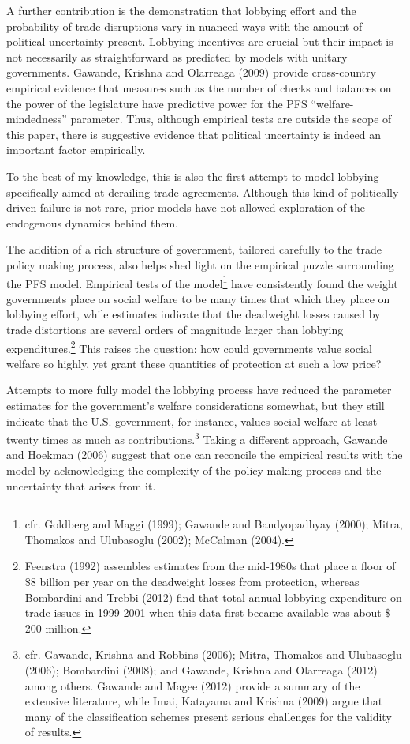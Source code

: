 \documentclass[10pt]{article}
\begin{document}
A further contribution is the demonstration that lobbying effort and the probability of trade disruptions vary in nuanced ways with the amount of political uncertainty present. Lobbying incentives are crucial but their impact is not necessarily as straightforward as predicted by models with unitary governments. Gawande, Krishna and Olarreaga (2009) provide cross-country empirical evidence that measures such as the number of checks and balances on the power of the legislature have predictive power for the PFS ``welfare-mindedness'' parameter. Thus, although empirical tests are outside the scope of this paper, there is suggestive evidence that political uncertainty is indeed an important factor empirically.

To the best of my knowledge, this is also the first attempt to model lobbying specifically aimed at derailing trade agreements. Although this kind of politically-driven failure is not rare, prior models have not allowed exploration of the endogenous dynamics behind them.

The addition of a rich structure of government, tailored carefully to the trade policy making process, also helps shed light on the empirical puzzle surrounding the PFS model. Empirical tests of the model\footnote{cfr. Goldberg and Maggi (1999); Gawande and Bandyopadhyay (2000); Mitra, Thomakos and Ulubasoglu (2002); McCalman (2004).\label{fn:gh_lobby}} have consistently found the weight governments place on social welfare to be many times that which they place on lobbying effort, while estimates indicate that the deadweight losses caused by trade distortions are several orders of magnitude larger than lobbying expenditures.\footnote{Feenstra (1992) assembles estimates from the mid-1980s that place a floor of $\$$8 billion per year on the deadweight losses from protection, whereas Bombardini and Trebbi (2012) find that total annual lobbying expenditure on trade issues in 1999-2001 when this data first became available was about $\$$200 million.} This raises the question: how could governments value social welfare so highly, yet grant these quantities of protection at such a low price?

Attempts to more fully model the lobbying process have reduced the parameter estimates for the government's welfare considerations somewhat, but they still indicate that the U.S. government, for instance, values social welfare at least twenty times as much as contributions.\footnote{cfr. Gawande, Krishna and Robbins (2006); Mitra, Thomakos and Ulubasoglu (2006); Bombardini (2008); and Gawande, Krishna and Olarreaga (2012) among others. Gawande and Magee (2012) provide a summary of the extensive literature, while Imai, Katayama and Krishna (2009) argue that many of the classification schemes present serious challenges for the validity of results.} Taking a different approach, Gawande and Hoekman (2006) suggest that one can reconcile the empirical results with the model by acknowledging the complexity of the policy-making process and the uncertainty that arises from it.
\end{document}
